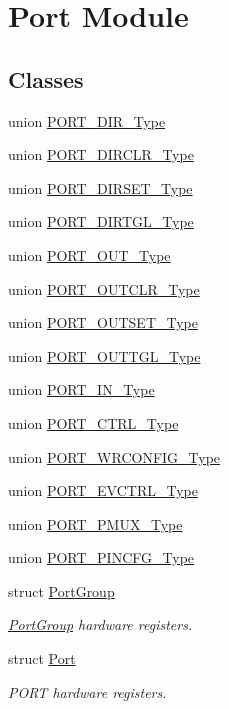 \hypertarget{group___s_a_m_l21___p_o_r_t}{}\section{Port Module}
\label{group___s_a_m_l21___p_o_r_t}
\subsection*{Classes}
\begin{DoxyCompactItemize}
\item 
union \hyperlink{union_p_o_r_t___d_i_r___type}{P\+O\+R\+T\+\_\+\+D\+I\+R\+\_\+\+Type}
\item 
union \hyperlink{union_p_o_r_t___d_i_r_c_l_r___type}{P\+O\+R\+T\+\_\+\+D\+I\+R\+C\+L\+R\+\_\+\+Type}
\item 
union \hyperlink{union_p_o_r_t___d_i_r_s_e_t___type}{P\+O\+R\+T\+\_\+\+D\+I\+R\+S\+E\+T\+\_\+\+Type}
\item 
union \hyperlink{union_p_o_r_t___d_i_r_t_g_l___type}{P\+O\+R\+T\+\_\+\+D\+I\+R\+T\+G\+L\+\_\+\+Type}
\item 
union \hyperlink{union_p_o_r_t___o_u_t___type}{P\+O\+R\+T\+\_\+\+O\+U\+T\+\_\+\+Type}
\item 
union \hyperlink{union_p_o_r_t___o_u_t_c_l_r___type}{P\+O\+R\+T\+\_\+\+O\+U\+T\+C\+L\+R\+\_\+\+Type}
\item 
union \hyperlink{union_p_o_r_t___o_u_t_s_e_t___type}{P\+O\+R\+T\+\_\+\+O\+U\+T\+S\+E\+T\+\_\+\+Type}
\item 
union \hyperlink{union_p_o_r_t___o_u_t_t_g_l___type}{P\+O\+R\+T\+\_\+\+O\+U\+T\+T\+G\+L\+\_\+\+Type}
\item 
union \hyperlink{union_p_o_r_t___i_n___type}{P\+O\+R\+T\+\_\+\+I\+N\+\_\+\+Type}
\item 
union \hyperlink{union_p_o_r_t___c_t_r_l___type}{P\+O\+R\+T\+\_\+\+C\+T\+R\+L\+\_\+\+Type}
\item 
union \hyperlink{union_p_o_r_t___w_r_c_o_n_f_i_g___type}{P\+O\+R\+T\+\_\+\+W\+R\+C\+O\+N\+F\+I\+G\+\_\+\+Type}
\item 
union \hyperlink{union_p_o_r_t___e_v_c_t_r_l___type}{P\+O\+R\+T\+\_\+\+E\+V\+C\+T\+R\+L\+\_\+\+Type}
\item 
union \hyperlink{union_p_o_r_t___p_m_u_x___type}{P\+O\+R\+T\+\_\+\+P\+M\+U\+X\+\_\+\+Type}
\item 
union \hyperlink{union_p_o_r_t___p_i_n_c_f_g___type}{P\+O\+R\+T\+\_\+\+P\+I\+N\+C\+F\+G\+\_\+\+Type}
\item 
struct \hyperlink{struct_port_group}{Port\+Group}
\begin{DoxyCompactList}\small\item\em \hyperlink{struct_port_group}{Port\+Group} hardware registers. \end{DoxyCompactList}\item 
struct \hyperlink{struct_port}{Port}
\begin{DoxyCompactList}\small\item\em P\+O\+R\+T hardware registers. \end{DoxyCompactList}\end{DoxyCompactItemize}
